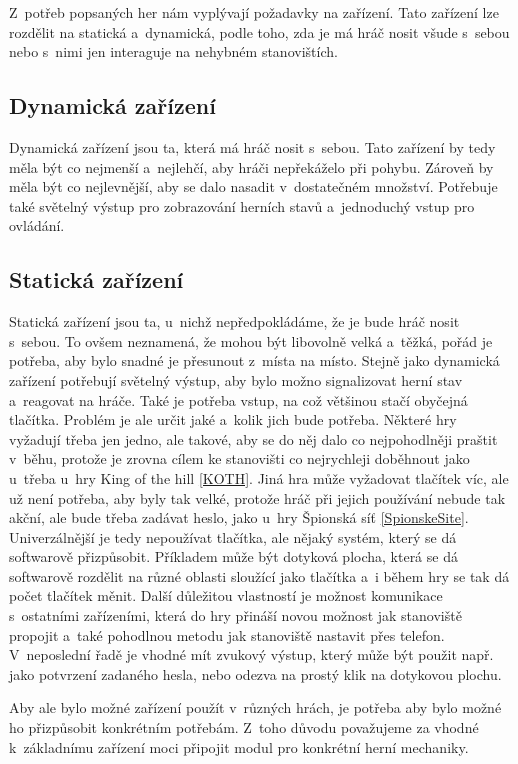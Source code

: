 Z~potřeb popsaných her nám vyplývají požadavky na zařízení.
Tato zařízení lze rozdělit na statická a~dynamická, podle toho, zda je má hráč nosit všude s~sebou nebo s~nimi jen interaguje na nehybném stanovištích.

\subsection{Dynamická zařízení}
Dynamická zařízení jsou ta, která má hráč nosit s~sebou.
Tato zařízení by tedy měla být co nejmenší a~nejlehčí, aby hráči nepřekáželo při pohybu.
Zároveň by měla být co nejlevnější, aby se dalo nasadit v~dostatečném množství.
Potřebuje také světelný výstup pro zobrazování herních stavů a~jednoduchý vstup pro ovládání. 

\subsection{Statická zařízení}
Statická zařízení jsou ta, u~nichž nepředpokládáme, že je bude hráč nosit s~sebou.
To ovšem neznamená, že mohou být libovolně velká a~těžká, pořád je potřeba, aby bylo snadné je přesunout z~místa na místo.
Stejně jako dynamická zařízení potřebují světelný výstup, aby bylo možno signalizovat herní stav a~reagovat na hráče.
Také je potřeba vstup, na což většinou stačí obyčejná tlačítka.
Problém je ale určit jaké a~kolik jich bude potřeba.
Některé hry vyžadují třeba jen jedno, ale takové, aby se do něj dalo co nejpohodlněji praštit v~běhu, protože je zrovna cílem ke stanovišti co nejrychleji doběhnout jako u~třeba u~hry King of the hill \ref{KOTH}.
Jiná hra může vyžadovat tlačítek víc, ale už není potřeba, aby byly tak velké, protože hráč při jejich používání nebude tak akční, ale bude třeba zadávat heslo, jako u~hry Špionská síť \ref{SpionskeSite}.
Univerzálnější je tedy nepoužívat tlačítka, ale nějaký systém, který se dá softwarově přizpůsobit.
Příkladem může být dotyková plocha, která se dá softwarově rozdělit na různé oblasti sloužící jako tlačítka a~i během hry se tak dá počet tlačítek měnit.
Další důležitou vlastností je možnost komunikace s~ostatními zařízeními, která do hry přináší novou možnost jak stanoviště propojit a~také pohodlnou metodu jak stanoviště nastavit přes telefon.
V~neposlední řadě je vhodné mít zvukový výstup, který může být použit např. jako potvrzení zadaného hesla, nebo odezva na prostý klik na dotykovou plochu.

Aby ale bylo možné zařízení použít v~různých hrách, je potřeba aby bylo možné ho přizpůsobit konkrétním potřebám.
Z~toho důvodu považujeme za vhodné k~základnímu zařízení moci připojit modul pro konkrétní herní mechaniky.

